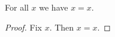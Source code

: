 \begin{proposition}\label{assumetest}
    For all $x$ we have $x = x$.
\end{proposition}
\begin{proof}
    Fix $x$.
    Then $x = x$.
\end{proof}

